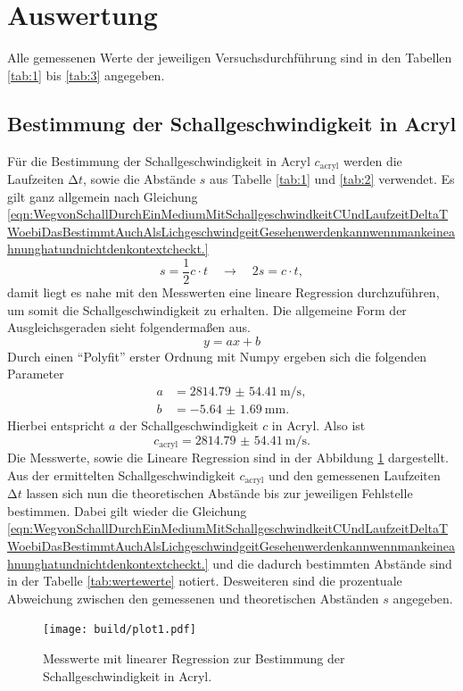 \section{Auswertung}

Alle gemessenen Werte der jeweiligen Versuchsdurchführung sind in den Tabellen \ref{tab:1} bis \ref{tab:3} angegeben. 

\subsection{Bestimmung der Schallgeschwindigkeit in Acryl}

Für die Bestimmung der Schallgeschwindigkeit in Acryl $c_{\text{acryl}}$ werden die Laufzeiten $\increment t$, sowie die Abstände $s$ aus Tabelle \ref{tab:1} und \ref{tab:2} verwendet.
Es gilt ganz allgemein nach Gleichung \eqref{eqn:WegvonSchallDurchEinMediumMitSchallgeschwindkeitCUndLaufzeitDeltaTWoebiDasBestimmtAuchAlsLichgeschwindgeitGesehenwerdenkannwennmankeineahnunghatundnichtdenkontextcheckt.}
\begin{equation*}
s = \frac{1}{2} c \cdot t \quad \to \quad 2s = c \cdot t,
\end{equation*}
damit liegt es nahe mit den Messwerten eine lineare Regression durchzuführen, um somit die Schallgeschwindigkeit zu erhalten.
Die allgemeine Form der Ausgleichsgeraden sieht folgendermaßen aus.
\begin{equation*}
y = ax + b
\end{equation*}
Durch einen \enquote{Polyfit} erster Ordnung mit Numpy \cite{numpy} ergeben sich die folgenden Parameter 
\begin{align*}
a &= \SI{2814.79(5441)}{\meter\per\second}, \\
b &= \SI{-5.64(169)}{\milli\meter}.
\end{align*}
Hierbei entspricht $a$ der Schallgeschwindigkeit $c$ in Acryl. Also ist 
\begin{equation}
    \label{eqn:1}
c_{\text{acryl}} = \SI{2814.79(5441)}{\meter\per\second}.
\end{equation}
Die Messwerte, sowie die Lineare Regression sind in der Abbildung \ref{fig:plot1} dargestellt.
\newline
Aus der ermittelten Schallgeschwindigkeit $c_{\text{acryl}}$ und den gemessenen Laufzeiten $\increment t$ lassen sich nun die theoretischen Abstände bis zur jeweiligen Fehlstelle bestimmen. 
Dabei gilt wieder die Gleichung \eqref{eqn:WegvonSchallDurchEinMediumMitSchallgeschwindkeitCUndLaufzeitDeltaTWoebiDasBestimmtAuchAlsLichgeschwindgeitGesehenwerdenkannwennmankeineahnunghatundnichtdenkontextcheckt.} und die dadurch bestimmten Abstände sind
in der Tabelle \ref{tab:wertewerte} notiert. Desweiteren sind die prozentuale Abweichung zwischen den gemessenen und theoretischen Abständen $s$ angegeben. 
\newpage
\begin{figure}
    \centering
    \texttt{[image: build/plot1.pdf]}
    \caption{Messwerte mit linearer Regression zur Bestimmung der Schallgeschwindigkeit in Acryl.} 
    \label{fig:plot1}
\end{figure}

